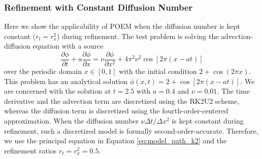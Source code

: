 
\FloatBarrier %
\subsubsection{Refinement with Constant Diffusion Number}
Here we show the applicability of POEM when the diffusion number is kept constant ($r_t = r_x^2$) during refinement. The test problem is solving the advection-diffusion equation with a source
\begin{equation}
    \frac{\partial \phi}{\partial t} + a \frac{\partial \phi}{\partial x} = \nu \frac{\partial \phi}{\partial x^2} + 4\pi^2 \nu^2 \cos[2\pi (x - at)]
\end{equation}
over the periodic domain $x \in [0,1]$ with the initial condition $2 + \cos(2\pi x)$. This problem has an analytical solution $\phi(x,t) = 2 + \cos[2\pi (x - at)]$. We are concerned with the solution at $t=2.5$ with $a=0.4$ and $\nu=0.01$. The time derivative and the advection term are discretized using the RK2U2 scheme, whereas the diffusion term is discretized using the fourth-order-centered approximation. When the diffusion number $\nu \Delta t / \Delta x^2$ is kept constant during refinement, such a discretized model is formally second-order-accurate. Therefore, we use the principal equation in Equation \ref{eq:model_path_k2} and the refinement ratios $r_t = r_x^2 = 0.5$.

